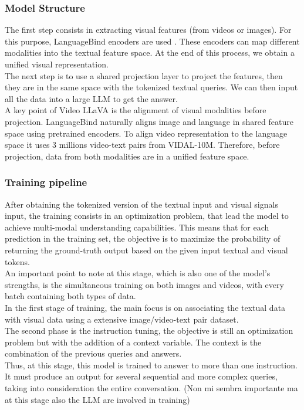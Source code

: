 \documentclass[10pt,twocolumn,letterpaper]{article}
\begin{document}
\subsubsection{Model Structure}
The first step consists in extracting visual features (from videos or images). For this purpose, LanguageBind encoders are used \cite{b9}. These encoders can map different modalities into the textual feature space. At the end of this process, we obtain a unified visual representation.\\ 
The next step is to use a shared projection layer to project the features, then they are in the same space with the tokenized textual queries. We can then input all the data into a large LLM to get the answer.\\
A key point of Video LLaVA is the alignment of visual modalities before projection. LanguageBind naturally aligns image and language in shared feature space using pretrained encoders. To align video representation to the language space it uses 3 millions video-text pairs from VIDAL-10M\cite{b9}. Therefore, before projection, data from both modalities are in a unified feature space.

\subsubsection{Training pipeline}
After obtaining the tokenized version of the textual input and visual signals input, the training consists in an optimization problem, that lead the model to achieve multi-modal understanding capabilities.
This means that for each prediction in the training set, the objective is to maximize the probability of returning the ground-truth output based on the given input textual and visual tokens. \\
An important point to note at this stage, which is also one of the model's strengths, is the simultaneous training on both images and videos, with every batch containing both types of data.\\
In the first stage of training, the main focus is on associating the textual data with visual data using a extensive image/video-text pair dataset.\\
The second phase is the instruction tuning, the objective is still an optimization problem but with the addition of a context variable. The context is the combination of the previous queries and answers.\\
Thus, at this stage, this model is trained to answer to more than one instruction. It must produce an output for several sequential and more complex queries, taking into consideration the entire conversation.
(Non mi sembra importante ma at this stage also the LLM are involved in training)
\end{document}
